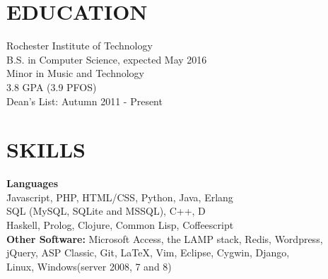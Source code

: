 \documentclass[line,margin]{res}
\begin{document}
\address{6000 Reynolds Dr, \#1482\\ Rochester, NY 14623}
\address{(646) 320-9143\\leeavital@gmail.com}


\begin{resume}
 
\section{EDUCATION}  Rochester Institute of Technology \\ 
                     B.S. in  Computer Science,  expected May 2016 \\
	                 Minor in Music and Technology\\
	                 3.8 GPA (3.9 PFOS) \\
	                 Dean's List: Autumn 2011 - Present
 \section{SKILLS} \vspace{-2ex}
	\begin{tabbing}
	  
	  
    {\bf Languages } \hspace{.5in} \= \\  
	\hspace{.2in}{\sl Very Experienced} \hspace{.5in}	\= Javascript, PHP, HTML/CSS, Python, Java, Erlang \\ 
	\hspace{.2in}{\sl Proficient} \> SQL (MySQL, SQLite and MSSQL), C++, D\\	
	\hspace{.2in}{\sl Less Experienced} \> Haskell, Prolog, Clojure, Common Lisp, Coffeescript\\
	  	
	{\bf Other Software:}           \> Microsoft Access, the LAMP stack, Redis, Wordpress,  \\ 
				                    \>	jQuery, ASP Classic, Git, LaTeX, Vim, Eclipse, Cygwin, Django, \\
				                    \>  Linux, Windows(server 2008, 7 and 8) \\
	

\end{tabbing}
\end{resume}
\end{document}
